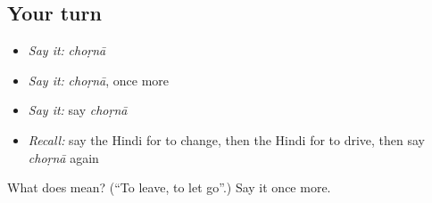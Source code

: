 \subsection*{Your turn}
\begin{itemize}
\raggedright
  \item \emph{Say it:} \emph{choṛnā}
  \item \emph{Say it:} \emph{choṛnā}, once more
  \item \emph{Say it:} say \emph{choṛnā}
  \item \emph{Recall:} say the Hindi for to change, then the Hindi for to drive, then say \emph{choṛnā} again
\end{itemize}

\begin{tcolorbox}[breakable,colback=teal!4,colframe=teal!35!black,title={Before you move on}]
What does  mean? (\textquotedblleft{}To leave, to let go\textquotedblright{}.) Say it once more.
\end{tcolorbox}
